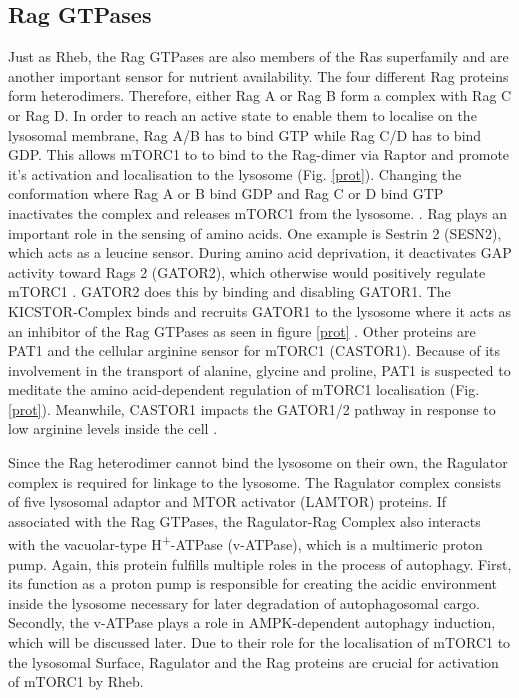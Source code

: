 \documentclass[12pt]{article} %
\begin{document}
\begin{linenumbers*}
\subsection{Rag GTPases}
Just as Rheb, the Rag GTPases are also members of the Ras superfamily and are another important sensor for nutrient availability. The four different Rag proteins form heterodimers. Therefore, either Rag A or Rag B form a complex with Rag C or Rag D. In order to reach an active state to enable them to localise on the lysosomal membrane, Rag A/B has to bind GTP while Rag C/D has to bind GDP. This allows mTORC1 to to bind to the Rag-dimer via Raptor and promote it's activation and localisation to the lysosome (Fig. \ref{prot}). Changing the conformation where Rag A or B bind GDP and Rag C or D bind GTP inactivates the complex and releases mTORC1 from the lysosome. 
\citep{RabanalRuiz2018, Carroll2017}.
Rag plays an important role in the sensing of amino acids. One example is Sestrin 2 (SESN2), which acts as a leucine sensor. During amino acid deprivation, it deactivates GAP activity toward Rags 2 (GATOR2), which otherwise would positively regulate mTORC1 . GATOR2 does this by binding and disabling GATOR1. The KICSTOR-Complex binds and recruits GATOR1 to the lysosome where it acts as an inhibitor of the Rag GTPases as seen in figure \ref{prot} \citep{Gu2017}.  
Other proteins are PAT1 and the cellular arginine sensor for mTORC1 (CASTOR1). Because of its involvement in the transport of alanine, glycine and proline, PAT1 is suspected to meditate the amino acid-dependent regulation of mTORC1 localisation (Fig. \ref{prot}). Meanwhile, CASTOR1 impacts the GATOR1/2 pathway in response to low arginine levels inside the cell
\citep{RabanalRuiz2018, Shafei2017, Sciarretta2018}.

Since the Rag heterodimer cannot bind the lysosome on their own, the Ragulator complex is required for linkage to the lysosome. The Ragulator complex consists of five lysosomal adaptor and MTOR activator (LAMTOR) proteins. If associated with the Rag GTPases, the Ragulator-Rag Complex also interacts with the vacuolar-type H\textsuperscript{+}-ATPase (v-ATPase), which is a multimeric proton pump. Again, this protein fulfills multiple roles in the process of autophagy. First, its function as a proton pump is responsible for creating the acidic environment inside the lysosome necessary for later degradation of autophagosomal cargo. Secondly, the v-ATPase plays a role in AMPK-dependent autophagy induction, which will be discussed later.
Due to their role for the localisation of mTORC1 to the lysosomal Surface, Ragulator and the Rag proteins are crucial for activation of mTORC1 by Rheb.



\end{linenumbers*}
\end{document}
